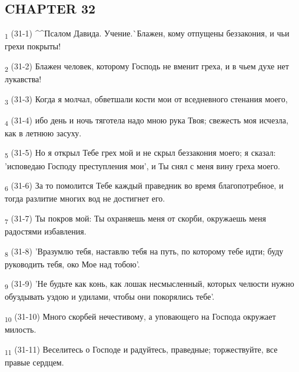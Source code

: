 \subsection{CHAPTER 32}
\begin{tcolorbox}
\textsubscript{1} (31-1) ^^Псалом Давида. Учение.^^ Блажен, кому отпущены беззакония, и чьи грехи покрыты!
\end{tcolorbox}
\begin{tcolorbox}
\textsubscript{2} (31-2) Блажен человек, которому Господь не вменит греха, и в чьем духе нет лукавства!
\end{tcolorbox}
\begin{tcolorbox}
\textsubscript{3} (31-3) Когда я молчал, обветшали кости мои от вседневного стенания моего,
\end{tcolorbox}
\begin{tcolorbox}
\textsubscript{4} (31-4) ибо день и ночь тяготела надо мною рука Твоя; свежесть моя исчезла, как в летнюю засуху.
\end{tcolorbox}
\begin{tcolorbox}
\textsubscript{5} (31-5) Но я открыл Тебе грех мой и не скрыл беззакония моего; я сказал: 'исповедаю Господу преступления мои', и Ты снял с меня вину греха моего.
\end{tcolorbox}
\begin{tcolorbox}
\textsubscript{6} (31-6) За то помолится Тебе каждый праведник во время благопотребное, и тогда разлитие многих вод не достигнет его.
\end{tcolorbox}
\begin{tcolorbox}
\textsubscript{7} (31-7) Ты покров мой: Ты охраняешь меня от скорби, окружаешь меня радостями избавления.
\end{tcolorbox}
\begin{tcolorbox}
\textsubscript{8} (31-8) 'Вразумлю тебя, наставлю тебя на путь, по которому тебе идти; буду руководить тебя, око Мое над тобою'.
\end{tcolorbox}
\begin{tcolorbox}
\textsubscript{9} (31-9) 'Не будьте как конь, как лошак несмысленный, которых челюсти нужно обуздывать уздою и удилами, чтобы они покорялись тебе'.
\end{tcolorbox}
\begin{tcolorbox}
\textsubscript{10} (31-10) Много скорбей нечестивому, а уповающего на Господа окружает милость.
\end{tcolorbox}
\begin{tcolorbox}
\textsubscript{11} (31-11) Веселитесь о Господе и радуйтесь, праведные; торжествуйте, все правые сердцем.
\end{tcolorbox}

